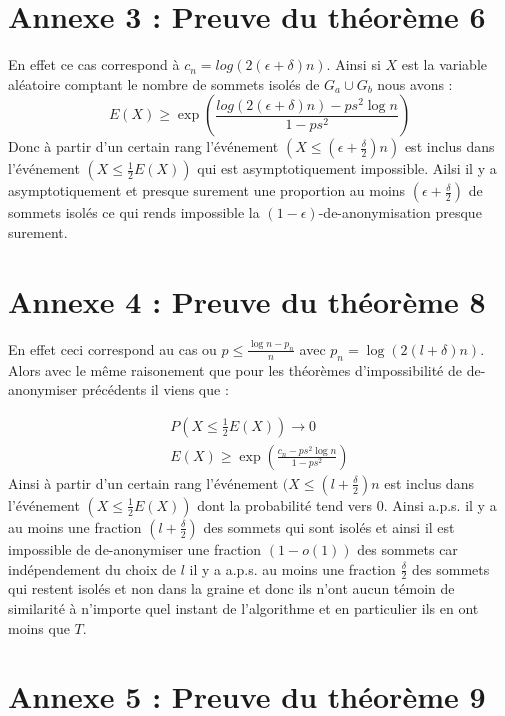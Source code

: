 \documentclass[letterpaper,10pt]{llncs}
\begin{document}
\section*{Annexe 3 : Preuve du théorème 6}

En effet ce cas correspond à $c_n = log(2(\epsilon + \delta)n)$. Ainsi si $X$ est la variable aléatoire comptant le nombre de sommets isolés de $G_a \cup G_b$ nous avons :
\[
  E(X) \geq \exp ( \frac{log(2(\epsilon + \delta)n) - ps^2 \log n}{1-ps^2} )
\]
Donc à partir d'un certain rang l'événement $(X \leq (\epsilon + \frac{\delta}{2})n)$ est inclus dans l'événement $(X \leq \frac{1}{2} E(X))$ qui est asymptotiquement impossible. Ailsi il y a asymptotiquement et presque surement une proportion au moins $(\epsilon + \frac{\delta}{2})$ de sommets isolés ce qui rends impossible la $(1-\epsilon)$-de-anonymisation presque surement.

\section*{Annexe 4 : Preuve du théorème 8}

En effet ceci correspond au cas ou $p \leq \frac{\log n - p_n}{n}$ avec $p_n = \log (2(l+\delta) n)$. Alors avec le même raisonement que pour les théorèmes d'impossibilité de de-anonymiser précédents il viens que :
\begin{center}
\[\begin{aligned}
  P(X \leq \frac{1}{2} E(X)) \rightarrow 0 \\
  E(X) \geq  \exp(\frac{c_n-ps^2\log n}{1-ps^2})
\end{aligned}\]
Ainsi à partir d'un certain rang l'événement $(X \leq (l+\frac{\delta}{2}) n$ est inclus dans l'événement $(X \leq \frac{1}{2} E(X))$ dont la probabilité tend vers 0. Ainsi a.p.s. il y a au moins une fraction $(l + \frac{\delta}{2})$ des sommets qui sont isolés et ainsi il est impossible de de-anonymiser une fraction $(1-o(1))$ des sommets car indépendement du choix de $l$ il y a a.p.s. au moins une fraction $\frac{\delta}{2}$ des sommets qui restent isolés et non dans la graine et donc ils n'ont aucun témoin de similarité à n'importe quel instant de l'algorithme et en particulier ils en ont moins que $T$. 
\end{center}

\section*{Annexe 5 : Preuve du théorème 9}
\end{document}
